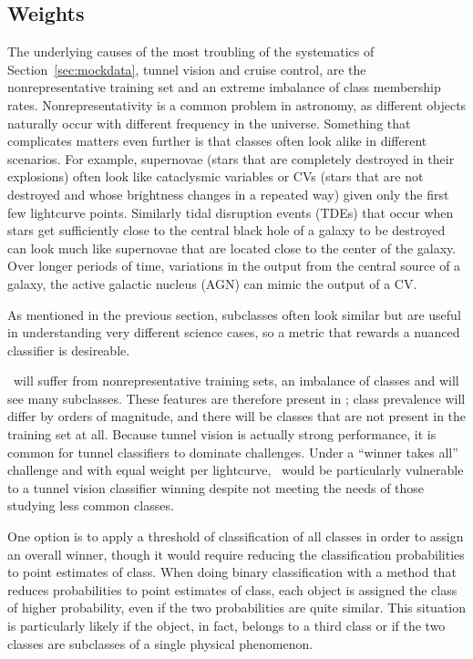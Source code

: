 \subsection{Weights}
\label{sec:weights}


The underlying causes of the most troubling of the systematics of Section~\ref{sec:mockdata}, tunnel vision and cruise control, are the nonrepresentative training set and an extreme imbalance of class membership rates.
Nonrepresentativity is a common problem in astronomy, as different objects naturally occur with different frequency in the universe.
Something that complicates matters even further is that classes often look alike in different scenarios.
For example, supernovae (stars that are completely destroyed in their explosions) often look like cataclysmic variables or CVs (stars that are not destroyed and whose brightness changes in a repeated way) given only the first few lightcurve points.
Similarly tidal disruption events (TDEs) that occur when stars get sufficiently close to the central black hole of a galaxy to be destroyed can look much like supernovae that are located close to the center of the galaxy.
Over longer periods of time, variations in the output from the central source of a galaxy, the active galactic nucleus (AGN) can mimic the output of a CV.

As mentioned in the previous section, subclasses often look similar but are useful in understanding very different science cases, so a metric that rewards a nuanced classifier is desireable.

\lsst\ will suffer from nonrepresentative training sets, an imbalance of classes and will see many subclasses.
These features are therefore present in \plasticc; class prevalence will differ by orders of magnitude, and there will be classes that are not present in the training set at all.
Because tunnel vision is actually strong performance, it is common for tunnel classifiers to dominate challenges.
Under a ``winner takes all'' challenge and with equal weight per lightcurve, \plasticc\ would be particularly vulnerable to a tunnel vision classifier winning despite not meeting the needs of those studying less common classes.

One option is to apply a threshold of classification of all classes in order to assign an overall winner, though it would require reducing the classification probabilities to point estimates of class.
When doing binary classification with a method that reduces probabilities to point estimates of class, each object is assigned the class of higher probability, even if the two probabilities are quite similar.
This situation is particularly likely if the object, in fact, belongs to a third class or if the two classes are subclasses of a single physical phenomenon.

